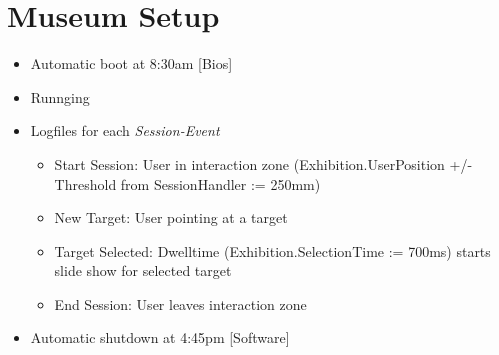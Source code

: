 
\section{Museum Setup}
\label{setup_museum}

\begin{itemize}
	\item Automatic boot at 8:30am [Bios]
	\item Runnging
	\item Logfiles for each \textit{Session-Event}
	\begin{itemize}
		\item Start Session: User in interaction zone (Exhibition.UserPosition +/- Threshold from SessionHandler := 250mm)
		\item New Target: User pointing at a target
		\item Target Selected: Dwelltime (Exhibition.SelectionTime := 700ms) starts slide show for selected target
		\item End Session: User leaves interaction zone
	\end{itemize}
	\item Automatic shutdown at 4:45pm [Software]
\end{itemize}